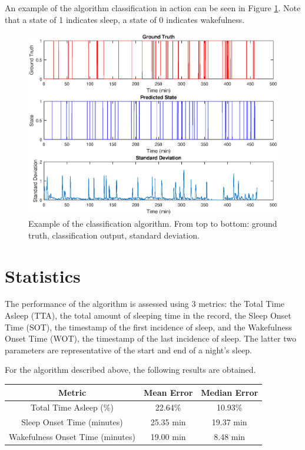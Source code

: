         An example of the algorithm classification in action can be seen in Figure \ref{img_ex_data_recording}. Note that a state of 1 indicates sleep, a state of 0 indicates wakefulness. 

        \begin{figure}[h]
            \includegraphics[width=\textwidth]{Images/example_data_recording.eps}
            \centering
            \caption{Example of the classification algorithm. From top to bottom: ground truth, classification output, standard deviation.}
            \label{img_ex_data_recording}
        \end{figure}

        \section{Statistics}

            The performance of the algorithm is assessed using 3 metrics: the Total Time Asleep (TTA), the total amount of sleeping time in the record, the Sleep Onset Time (SOT), the timestamp of the first incidence of sleep, and the Wakefulness Onset Time (WOT), the timestamp of the last incidence of sleep. The latter two parameters are representative of the start and end of a night's sleep. 

            For the algorithm described above, the following results are obtained.

            \begin{center}
                \label{tbl_sleep_errors}
                \begin{tabular}{|c||c|c|}
                    \hline
                    Metric & Mean Error & Median Error \\
                    \hline
                    Total Time Asleep (\%) & 22.64\% & 10.93\% \\
                    Sleep Onset Time (minutes) & 25.35 min & 19.37 min \\
                    Wakefulness Onset Time (minutes) & 19.00 min & 8.48 min \\
                    \hline
                \end{tabular}
            \end{center}

